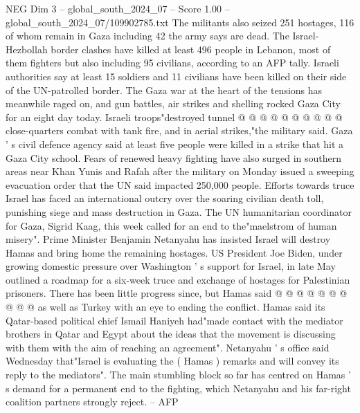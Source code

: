 \begin{textsample}{NEG Dim 3 – global\_south\_2024\_07 – Score 1.00 – global\_south\_2024\_07/109902785.txt}
The militants also seized 251 hostages, 116 of whom remain in Gaza including 42 the army says are dead.
The Israel-Hezbollah border clashes have killed at least 496 people in Lebanon, most of them fighters but also including 95 civilians, according to an AFP tally.
Israeli authorities say at least 15 soldiers and 11 civilians have been killed on their side of the UN-patrolled border.
The Gaza war at the heart of the tensions has meanwhile raged on, and gun battles, air strikes and shelling rocked Gaza City for an eight day today.
Israeli troops"destroyed tunnel @ @ @ @ @ @ @ @ @ @ close-quarters combat with tank fire, and in aerial strikes,"the military said.
Gaza ' s civil defence agency said at least five people were killed in a strike that hit a Gaza City school.
Fears of renewed heavy fighting have also surged in southern areas near Khan Yunis and Rafah after the military on Monday issued a sweeping evacuation order that the UN said impacted 250,000 people.
Efforts towards truce Israel has faced an international outcry over the soaring civilian death toll, punishing siege and mass destruction in Gaza.
The UN humanitarian coordinator for Gaza, Sigrid Kaag, this week called for an end to the"maelstrom of human misery".
Prime Minister Benjamin Netanyahu has insisted Israel will destroy Hamas and bring home the remaining hostages.
US President Joe Biden, under growing domestic pressure over Washington ' s support for Israel, in late May outlined a roadmap for a six-week truce and exchange of hostages for Palestinian prisoners.
There has been little progress since, but Hamas said @ @ @ @ @ @ @ @ @ @ as well as Turkey with an eye to ending the conflict.
Hamas said its Qatar-based political chief Ismail Haniyeh had"made contact with the mediator brothers in Qatar and Egypt about the ideas that the movement is discussing with them with the aim of reaching an agreement".
Netanyahu ' s office said Wednesday that"Israel is evaluating the ( Hamas ) remarks and will convey its reply to the mediators".
The main stumbling block so far has centred on Hamas ' s demand for a permanent end to the fighting, which Netanyahu and his far-right coalition partners strongly reject. -- AFP

\end{textsample}
